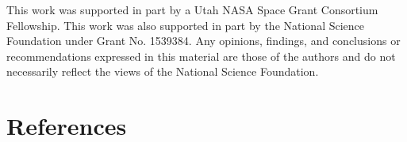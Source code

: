 \documentclass{jpconf}
\begin{document}
\ack 
This work was supported in part by a Utah NASA Space Grant Consortium Fellowship. This work was also supported in part by the National Science Foundation under Grant No. 1539384. Any opinions, findings, and conclusions or recommendations expressed in this material are those of the authors and do not necessarily reflect the views of the National Science Foundation.
\pagebreak
\section*{References}


\end{document}
